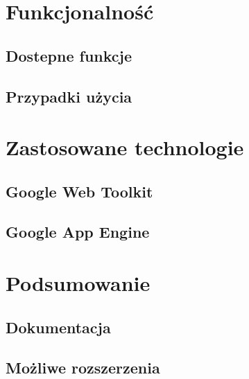 \documentclass{pracamgr}
\begin{document}
\chapter{Funkcjonalność}
\section{Dostepne funkcje}

\section{Przypadki użycia}




\chapter{Zastosowane technologie}
\section{Google Web Toolkit}
\section{Google App Engine}

\chapter{Podsumowanie}
\section{Dokumentacja}
\section{Możliwe rozszerzenia}



\begin{thebibliography}{99}





\end{thebibliography}
\end{document}
